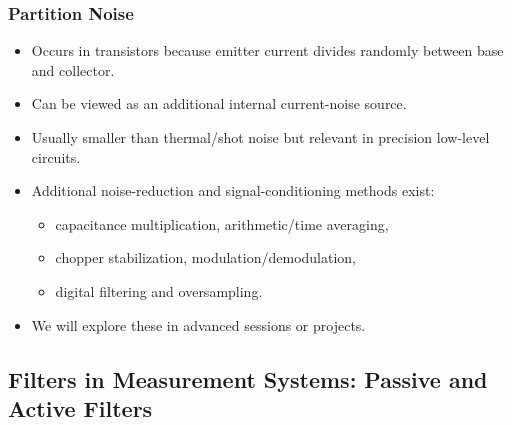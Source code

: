 \begin{frame}
	\frametitle{Partition Noise}
	\begin{itemize}
		\item Occurs in transistors because emitter current divides randomly between base and collector.
		\item Can be viewed as an additional internal current-noise source.
		\item Usually smaller than thermal/shot noise but relevant in precision low-level circuits.
	\end{itemize}
	\begin{itemize}
		\item Additional noise-reduction and signal-conditioning methods exist:
		\begin{itemize}
			\item capacitance multiplication, arithmetic/time averaging,
			\item chopper stabilization, modulation/demodulation,
			\item digital filtering and oversampling.
		\end{itemize}
		\item We will explore these in advanced sessions or projects.
	\end{itemize}
\end{frame}

\subsection{Filters in Measurement Systems: Passive and Active Filters}

